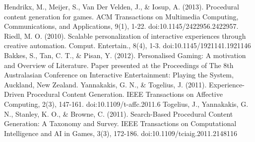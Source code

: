 \documentclass[a4paper,11pt]{article}
\begin{document}
    \begin{thebibliography}{9}
        Hendrikx, M., Meijer, S., Van Der Velden, J., \& Iosup, A. (2013). Procedural content generation for games. ACM Transactions on Multimedia Computing, Communications, and Applications, 9(1), 1-22. doi:10.1145/2422956.2422957.
        Riedl, M. O. (2010). Scalable personalization of interactive experiences through creative automation. Comput. Entertain., 8(4), 1-3. doi:10.1145/1921141.1921146
        Bakkes, S., Tan, C. T., \& Pisan, Y. (2012). Personalised Gaming: A motivation and Overview of Literature. Paper presented at the Proceedings of The 8th Australasian Conference on Interactive Entertainment: Playing the System, Auckland, New Zealand. 
        Yannakakis, G. N., \& Togelius, J. (2011). Experience-Driven Procedural Content Generation. IEEE Transactions on Affective Computing, 2(3), 147-161. doi:10.1109/t-affc.2011.6
        Togelius, J., Yannakakis, G. N., Stanley, K. O., \& Browne, C. (2011). Search-Based Procedural Content Generation: A Taxonomy and Survey. IEEE Transactions on Computational Intelligence and AI in Games, 3(3), 172-186. doi:10.1109/tciaig.2011.2148116
    \end{thebibliography}

  
\end{document}
